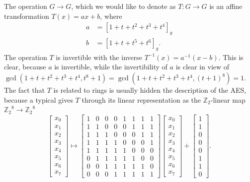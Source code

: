 \documentclass[11pt,a4paper]{amsart}
\newcommand{\Z}{\mathbb{Z}}
\begin{document}
The operation $G \to G$, which we would like to denote as $T : G \to G$ is an affine transformation $T (x) = a x + b$, where 
\begin{align*} 
a & = [ 1+ t + t^2 + t^3 + t^4 ]_g
\\ b & = [1+ t + t^5 + t^6]_g.
\end{align*}  
The operation $T$ is invertible with the inverse $T^{-1} (x) = a^{-1} (x-b)$. This is clear, because $a$ is invertible, while the invertibility of $a$ is clear in view of $\gcd( 1 + t + t^2 + t^3 + t^4, t^8 + 1) = \gcd( 1 + t + t^2 + t^3  + t^4, (t+1)^8 ) = 1$. The fact that $T$ is related to rings is usually hidden the description of the AES, because a typical gives $T$ through its linear representation as the $\Z_2$-linear map ${\Z_2}^8 \to {\Z_2}^8$
\[
	\begin{bmatrix} x_0 \\ x_1 \\ x_2 \\ x_3 \\ x_4\\ x_5 \\ x_6 \\ x_7 \end{bmatrix} \mapsto 
	\begin{bmatrix} 
1 & 0 & 0 & 0 & 1 & 1 & 1 & 1 \\
1 & 1 & 0 & 0 & 0 & 1 & 1 & 1 \\
1 & 1 & 1 & 0 & 0 & 0 & 1 & 1 \\
1 & 1 & 1 & 1 & 0 & 0 & 0 & 1 \\
1 & 1 & 1 & 1 & 1 & 0 & 0 & 0 \\
0 & 1 & 1 & 1 & 1 & 1 & 0 & 0 \\
0 & 0 & 1 & 1 & 1 & 1 & 1 & 0 \\
0 & 0 & 0 & 1 & 1 & 1 & 1 & 1
	\end{bmatrix} 
	\begin{bmatrix} x_0 \\ x_1 \\ x_2 \\ x_3 \\ x_4\\ x_5 \\ x_6 \\ x_7 \end{bmatrix}
	+ \begin{bmatrix} 1 \\ 1  \\ 0 \\ 0  \\ 0 \\ 1 \\ 1 \\ 0  \end{bmatrix}. 
\]
\end{document}
